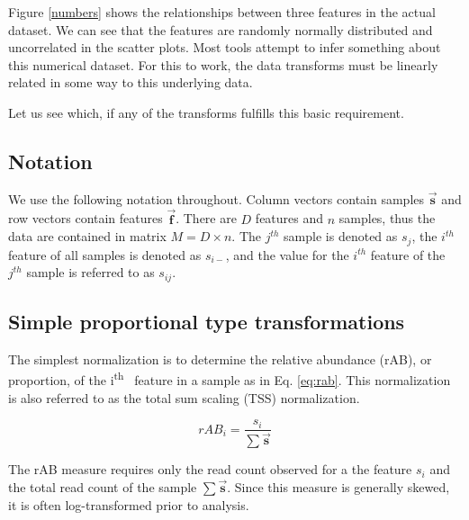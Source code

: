\documentclass[twocolumn]{article}
\newcommand{\ith}[1]{ #1\textsuperscript{th}\ }
\begin{document}
Figure \ref{numbers} shows the relationships between three features in
the actual dataset. We can see that the features are randomly normally
distributed and uncorrelated in the scatter plots. Most tools attempt to
infer something about this numerical dataset. For this to work, the data
transforms must be linearly related in some way to this underlying data.

Let us see which, if any of the transforms fulfills this basic
requirement.

\subsection{Notation}\label{notation}

We use the following notation throughout. Column vectors contain samples
\(\vec{\textbf{s}}\) and row vectors contain features
\(\vec{\textbf{f}}\). There are \(D\) features and \(n\) samples, thus
the data are contained in matrix \(M = D \times n\). The \(j^{th}\)
sample is denoted as \(s_{j}\), the \(i^{th}\) feature of all samples is
denoted as \(s_{i-}\), and the value for the \(i^{th}\) feature of the
\(j^{th}\) sample is referred to as \(s_{ij}\).

\subsection{Simple proportional type
transformations}\label{simple-proportional-type-transformations}

The simplest normalization is to determine the relative abundance (rAB),
or proportion, of the \ith{i} feature in a sample as in Eq.
\ref{eq:rab}. This normalization is also referred to as the total sum
scaling (TSS) normalization.

\begin{equation}
    rAB_{i} = \frac{s_{i}}{\sum{\vec{\textbf{s}}}}
    \label{eq:rab}
\end{equation}

The rAB measure requires only the read count observed for a the feature
\(s_i\) and the total read count of the sample
\(\sum{\vec{\textbf{s}}}\). Since this measure is generally skewed, it
is often log-transformed prior to analysis.
\end{document}
